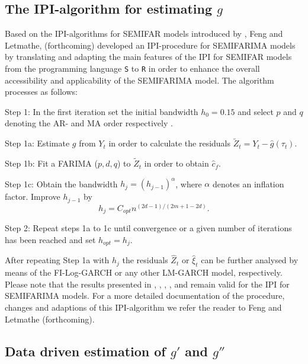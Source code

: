 \documentclass[12pt]{article}
\begin{document}
\subsection{The IPI-algorithm for estimating $g$}



Based on the IPI-algorithms for SEMIFAR models introduced by \citet{beran2002iterative}, Feng and Letmathe, (forthcoming) developed an IPI-procedure for SEMIFARIMA models by translating and adapting the main features of the IPI for SEMIFAR models from the programming language \texttt{S} to \texttt{R} in order to enhance the overall accessibility and applicability of the SEMIFARIMA model. The algorithm processes as follows:

\noindent Step 1: In the first iteration set the initial bandwidth $h_0 = 0.15$ and select $p$ and $q$ 
\indent denoting the AR- and MA order respectively . 

Step 1a: Estimate $g$ from $Y_t$ in order to calculate the residuals $\tilde{Z}_t = Y_t - \hat{g}(\tau_t)$. 

Step 1b: Fit a FARIMA ($p,d,q$) to $\tilde{Z}_t$ in order to obtain $\hat{c}_f$.

Step 1c: Obtain the bandwidth $h_j=(h_{j-1})^\alpha$, where $\alpha$ denotes an 
inflation factor. \indent  Improve $h_{j-1}$ by 
\begin{equation}
h_j=C_{opt}n^{(2d-1)/(2m+1-2d)}.
\end{equation} 

\noindent Step 2: Repeat steps 1a to 1c until convergence or a given number of iterations has been 
\indent reached and set $h_{opt} = h_j$.


After repeating Step 1a with $h_j$ the residuals $\hat{Z}_t$ or $\hat{\xi}_t$ can be further analysed by means of the FI-Log-GARCH or any other LM-GARCH model, respectively. Please note that the results presented in \citet{beran1999semifar}, \citet{beran2001volatility}, \citet{beran2002iterative}, \citet{beran2002local}, \citet{beran2002semifar} and \citet{beran2016long} remain valid for the IPI for SEMIFARIMA models. For a more detailed documentation of the procedure, changes and adaptions of this IPI-algorithm we refer the reader to Feng and Letmathe (forthcoming). 
\subsection{Data driven estimation of $g'$ and $g''$}    
\end{document}
